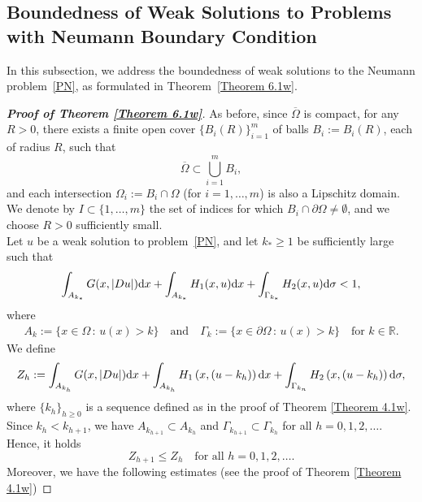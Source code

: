 \documentclass[10pt,reqno]{amsart}
\newcommand *\w{^\wedge}
\theoremstyle{definition}
\numberwithin{equation}{section}
\begin{document}
\subsection{Boundedness of Weak Solutions to Problems with Neumann Boundary Condition}\label{subsection3}

In this subsection, we address the boundedness of weak solutions to the Neumann problem~\eqref{PN}, as formulated in Theorem~\ref{Theorem 6.1w}.

\begin{proof}[\textbf{Proof of Theorem \ref{Theorem 6.1w}}]
	As before, since $\overline{\Omega}$ is compact, for any \( R > 0 \), there exists a finite open cover \( \{B_i(R)\}_{i=1}^m \) of balls \( B_i := B_i(R) \), each of radius \( R \), such that 
\[
\overline{\Omega} \subset \bigcup_{i=1}^{m} B_i,
\]
and each intersection \( \Omega_i := B_i \cap \Omega \) (for \( i = 1, \ldots, m \)) is also a Lipschitz domain.\\ 
We denote by \( I \subset \{1, \ldots, m\} \) the set of indices for which \( B_i \cap \partial\Omega \neq \emptyset \), and we choose \( R > 0 \) sufficiently small.\\
Let \( u \) be a weak solution to problem~\eqref{PN}, and let \( k_* \geq 1 \) be sufficiently large such that 
	\begin{equation}\label{N.k*11}
		\int_{A_{k_*}}G(x,|D u|){\rm d}x+\int_{A_{k_*}}H_1(x,u){\rm d}x+\int_{\Gamma_{k_*}}H_2(x,u){\rm d}\sigma<1,
	\end{equation}
	where
	\begin{align*}
		A_k:=\{x\in\Omega \, : \, u(x)>k\} \quad\text{and}\quad \Gamma_k:=\{x\in\partial\Omega \,:\, u(x)>k\} \quad\text{for }k\in\mathbb{R}.
	\end{align*}
	We define
	\begin{equation}\label{N.Zn.def11}
		Z_h:=\int_{A_{k_h}}G(x,|D u|){\rm d}x+\int_{A_{k_h} }H_1\left(x,(u-k_h)\right){\rm d}x+\int_{\Gamma_{k_n}}H_2\left(x,(u-k_h)\right){\rm d}\sigma,
	\end{equation}
	where $\{k_{h}\}_{h\geq 0}$ is a sequence defined as in the proof of Theorem \ref{Theorem 4.1w}. Since $k_{h}<k_{h+1}$, we have $A_{k_{h+1}}\subset A_{k_{h}}$ and $\Gamma_{k_{h+1}}\subset \Gamma_{k_{h}}$ for all $h=0,1,2,\ldots$. Hence, it hol{\rm d}s
	\begin{equation}\label{N.Zn.decreasing11}
	Z_{h+1}\leq Z_h\quad\text{for all }h=0,1,2,\ldots.
	\end{equation}
	Moreover, we have the following estimates (see the proof of Theorem \ref{Theorem 4.1w})

\end{proof}
\end{document}
